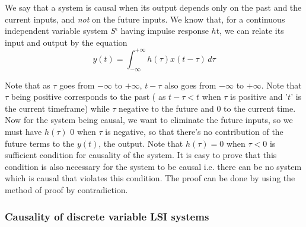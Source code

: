 We say that a system is causal when its output depends only on the past and the current inputs, and \textit{not} on the future inputs. We know that, for a continuous independent variable system $S$` having impulse response $h$t, we can relate its input and output by the equation
\begin{equation}
y(t)=\int_{-\infty}^{+\infty} h(\tau)x(t-\tau)\,d\tau \nonumber
\end{equation}

Note that as $\tau$ goes from ${-\infty}$ to ${+\infty}$, $t-\tau$ also goes from ${-\infty}$ to ${+\infty}$. Note that $\tau$ being positive corresponds to the past ( as $t-\tau < t$ when $\tau$ is positive and '$t$' is the current timeframe) while $\tau$ negative to the future and 0 to the current time. Now for the system being causal, we want to eliminate the future inputs, so we must have $h(\tau)$ 0 when $\tau$ is negative, so that there's no contribution of the future terms to the $y(t)$, the output. Note that $h(\tau)=0$ when $\tau<0$ is sufficient condition for causality of the system. It is easy to prove that this condition is also necessary for the system to be causal i.e. there can be no system which is causal that violates this condition. The proof can be done by using the method of proof by contradiction.

\subsubsection{Causality of discrete variable LSI systems}

